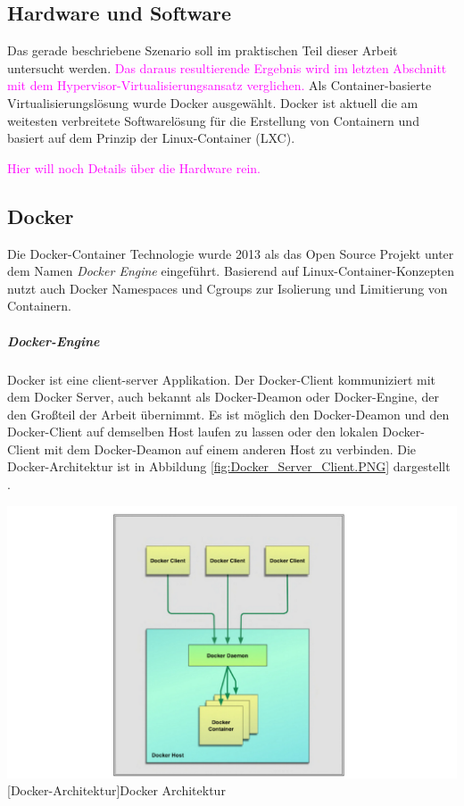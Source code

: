 \subsection{Hardware und Software}

Das gerade beschriebene Szenario soll im praktischen Teil dieser Arbeit untersucht werden. \textcolor{magenta}{Das daraus resultierende Ergebnis wird im letzten Abschnitt mit dem Hypervisor-Virtualisierungsansatz verglichen.} Als Container-basierte Virtualisierungslösung wurde Docker ausgewählt. Docker ist aktuell die am weitesten verbreitete Softwarelösung für die Erstellung von Containern und basiert auf dem Prinzip der Linux-Container (LXC).

\textcolor{magenta}{Hier will noch Details über die Hardware rein.}



\subsection{Docker}
Die Docker-Container Technologie wurde 2013 als das Open Source Projekt unter dem Namen \emph{Docker Engine} eingeführt. Basierend auf Linux-Container-Konzepten nutzt auch Docker Namespaces und Cgroups zur Isolierung und Limitierung von Containern.  

\subparagraph{Docker-Engine}
Docker ist eine client-server Applikation. Der Docker-Client kommuniziert mit dem Docker Server, auch bekannt als Docker-Deamon oder Docker-Engine, der den Großteil der Arbeit übernimmt. Es ist möglich den Docker-Deamon und den Docker-Client auf demselben Host laufen zu lassen oder den lokalen Docker-Client mit dem Docker-Deamon auf einem anderen Host zu verbinden. Die Docker-Architektur ist in Abbildung \ref{fig:Docker_Server_Client.PNG} dargestellt \cite{Turnbull2015TheBook}.

\vspace{1em}
\begin{minipage}{\linewidth}
	\centering
	\includegraphics[width=1\linewidth]{pics/Docker_Server_Client.PNG}
	[Docker-Architektur]{Docker Architektur\cite{Turnbull2015TheBook}}
	\label{fig:Docker_Server_Client.PNG}
\end{minipage}



